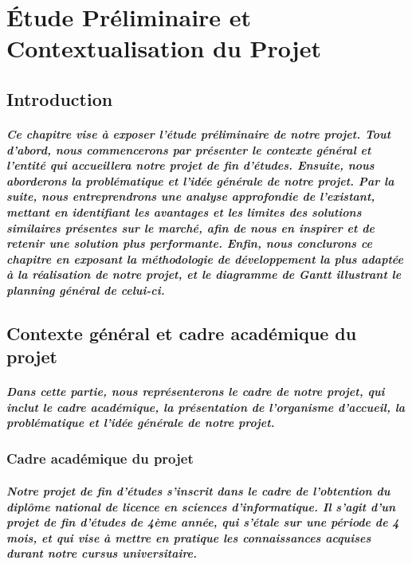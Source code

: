 \chapter{Étude Préliminaire et Contextualisation du Projet}

\section*{Introduction}
\paragraph{Ce chapitre vise à exposer l'étude préliminaire de notre projet. Tout d'abord, nous commencerons par présenter le contexte général et l'entité qui accueillera notre projet de fin d'études. Ensuite, nous aborderons la problématique et l'idée générale de notre projet. Par la suite, nous entreprendrons une analyse approfondie de l'existant, mettant en identifiant les avantages et les limites des solutions similaires présentes sur le marché, afin de nous en inspirer et de retenir une solution plus performante. Enfin, nous conclurons ce chapitre en exposant la méthodologie de développement la plus adaptée à la réalisation de notre projet, et le diagramme de Gantt illustrant le planning général de celui-ci.}

\section{Contexte général et cadre académique du projet}
\paragraph{Dans cette partie, nous représenterons le cadre de notre projet, qui inclut le cadre académique, la présentation de l'organisme d'accueil, la problématique et l'idée générale de notre projet.}

\subsection{Cadre académique du projet}
\paragraph{Notre projet de fin d'études s'inscrit dans le cadre de l'obtention du diplôme national de licence en sciences d'informatique. Il s'agit d'un projet de fin d'études de 4ème année, qui s'étale sur une période de 4 mois, et qui vise à mettre en pratique les connaissances acquises durant notre cursus universitaire.}

